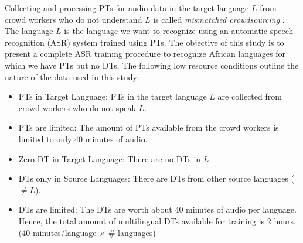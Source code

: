 \documentclass[a4paper]{article}
\begin{document}
Collecting and processing PTs for audio data in the target language $L$ from crowd workers who do not understand $L$ is called \emph{mismatched crowdsourcing} \cite{Jyothi-MismatchedCrowdsourcingTrans}. The language $L$ is the language we want to recognize using an automatic speech recognition (ASR) system trained using PTs. The objective of this study is to present a complete ASR training procedure to recognize African languages for which we have PTs but no DTs. 
 The following low resource conditions outline the nature of the data used in this study:  %
\begin{itemize}[leftmargin=*]
\item PTs in Target Language: PTs in the target language $L$ are collected from crowd workers who do not speak $L$. \vspace{-2mm}
\item PTs are limited: The amount of PTs available from the crowd workers is limited to only 40 minutes of audio.  \vspace{-2mm}
\item Zero DT in Target Language: There are no DTs in $L$.  \vspace{-2mm}
\item DTs only in Source Languages: There are DTs from other source languages ($\ne L$).  \vspace{-2mm}
\item DTs are limited: The DTs are worth about 40 minutes of audio per language. Hence, the total amount of multilingual DTs available for training is 2 hours. (40 minutes/language $\times$ \# languages)  \vspace{-1mm}
\end{itemize}
\end{document}
